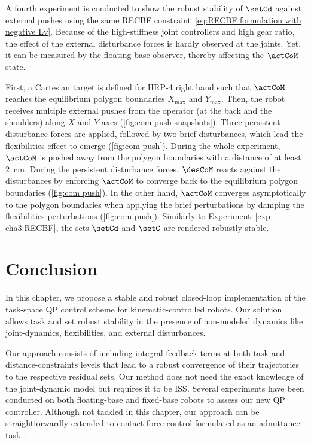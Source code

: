 A fourth experiment is conducted to show the robust stability of $\setCd$ against external pushes using the same RECBF constraint~\eqref{eq:RECBF formulation with negative Lv}. Because of the high-stiffness joint controllers and high gear ratio, the effect of the external disturbance forces is hardly observed at the joints. Yet, it can be measured by the floating-base observer, thereby affecting the $\actCoM$ state. 

First, a Cartesian target is defined for HRP-4 right hand such that $\actCoM$ reaches the equilibrium polygon boundaries ${X}_{\max}$ and ${Y}_{\max}$. Then, the robot receives multiple external pushes from the operator (at the back and the shoulders) along ${X}$ and ${Y}$ axes (\cref{fig:com push snapshots}). Three persistent disturbance forces are applied, followed by two brief disturbances, which lead the flexibilities effect to emerge (\cref{fig:com push}). During the whole experiment,  $\actCoM$ is pushed away from the polygon boundaries with a distance of at least $2$~cm. 
During the persistent disturbance forces, $\desCoM$ reacts against the disturbances by enforcing $\actCoM$ to converge back to the equilibrium polygon boundaries (\cref{fig:com push}). 
In the other hand, $\actCoM$ converges asymptotically to the polygon boundaries when applying the brief perturbations by damping the flexibilities perturbations (\cref{fig:com push}). Similarly to Experiment~\ref{exp-cha3:RECBF}, the sets $\setCd$ and $\setC$ are rendered robustly stable.

\section{Conclusion}
In this chapter, we propose a stable and robust closed-loop implementation of the task-space QP control scheme for kinematic-controlled robots. Our solution allows task and set robust stability in the presence of non-modeled dynamics like joint-dynamics, flexibilities, and external disturbances.

Our approach consists of including integral feedback terms at both task and distance-constraints levels that lead to a robust convergence of their trajectories to the respective residual sets. Our method does not need the exact knowledge of the joint-dynamic model but requires it to be ISS. Several experiments have been conducted on both floating-base and fixed-base robots to assess our new QP controller. Although not tackled in this chapter, our approach can be straightforwardly extended to contact force control formulated as an admittance task~\cite{bouyarmane2019tro}.		

